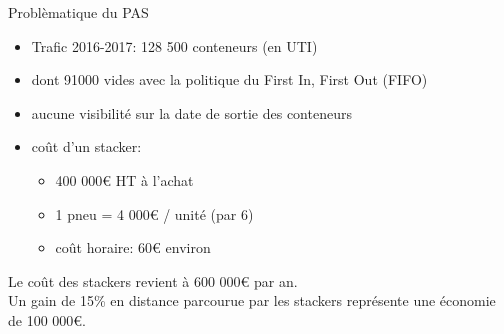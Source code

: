 \begin{frame}{Problèmatique du PAS}
      \begin{itemize}
      \item Trafic 2016-2017: 128 500 conteneurs (en UTI)
      \item dont 91000 vides avec la politique du First In, First Out (FIFO)
      \item aucune visibilité sur la date de sortie des conteneurs
      \item coût d'un stacker:
        \begin{itemize}
        \item 400 000\euro{}  HT à l'achat
        \item 1 pneu = 4 000\euro{} / unit\'e (par 6)
        \item coût horaire: 60\euro{}  environ
        \end{itemize}
      \end{itemize}
      \vfill
      Le coût des stackers revient à 600 000\euro{}  par an.\\
      Un gain de 15\% en distance parcourue par les stackers représente une économie de 100 000\euro.
\end{frame}

